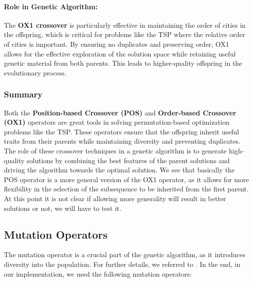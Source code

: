 \documentclass[11pt]{article}
\begin{document}
\paragraph{Role in Genetic Algorithm:}

The \textbf{OX1 crossover} is particularly effective in maintaining the order of cities in the offspring, which is critical for problems like the TSP where the relative order of cities is important. By ensuring no duplicates and preserving order, OX1 allows for the effective exploration of the solution space while retaining useful genetic material from both parents. This leads to higher-quality offspring in the evolutionary process.

\subsubsection{Summary}

Both the \textbf{Position-based Crossover (POS)} and \textbf{Order-based Crossover (OX1)} operators are great tools in solving permutation-based optimization problems like the TSP. These operators ensure that the offspring inherit useful traits from their parents while maintaining diversity and preventing duplicates. The role of these crossover techniques in a genetic algorithm is to generate high-quality solutions by combining the best features of the parent solutions and driving the algorithm towards the optimal solution. We see that basically the POS operator is a more general version of the OX1 operator, as it allows for more flexibility in the selection of the subsequence to be inherited from the first parent. At this point it is not clear if allowing more generality will result in better solutions or not, we will have to test it.

\subsection{Mutation Operators}
The mutation operator is a crucial part of the genetic algorithm, as it introduces diversity into the population. For further details, we referred to \cite{Larranaga1999}. In the end, in our implementation, we used the following mutation operators:
\end{document}
